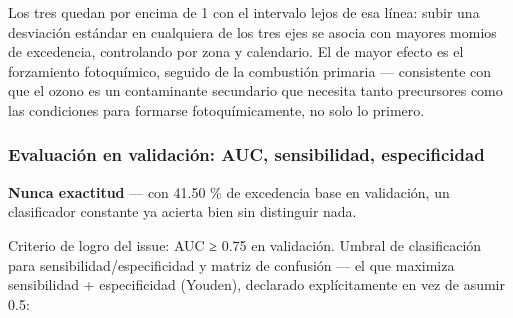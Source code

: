 \documentclass[
  spanish,
  letterpaper,
  DIV=11,
  numbers=noendperiod]{scrartcl}
\newenvironment{Shaded}{\begin{snugshade}}{\end{snugshade}}
\newcommand{\AttributeTok}[1]{\textcolor[rgb]{0.40,0.45,0.13}{#1}}
\newcommand{\CommentTok}[1]{\textcolor[rgb]{0.37,0.37,0.37}{#1}}
\newcommand{\ConstantTok}[1]{\textcolor[rgb]{0.56,0.35,0.01}{#1}}
\newcommand{\FunctionTok}[1]{\textcolor[rgb]{0.28,0.35,0.67}{#1}}
\newcommand{\NormalTok}[1]{\textcolor[rgb]{0.00,0.23,0.31}{#1}}
\newcommand{\OtherTok}[1]{\textcolor[rgb]{0.00,0.23,0.31}{#1}}
\newcommand{\SpecialCharTok}[1]{\textcolor[rgb]{0.37,0.37,0.37}{#1}}
\newcommand{\StringTok}[1]{\textcolor[rgb]{0.13,0.47,0.30}{#1}}
\begin{document}
Los tres quedan por encima de 1 con el intervalo lejos de esa línea:
subir una desviación estándar en cualquiera de los tres ejes se asocia
con mayores momios de excedencia, controlando por zona y calendario. El
de mayor efecto es el forzamiento fotoquímico, seguido de la combustión
primaria --- consistente con que el ozono es un contaminante secundario
que necesita tanto precursores como las condiciones para formarse
fotoquímicamente, no solo lo primero.

\subsubsection{Evaluación en validación: AUC, sensibilidad,
especificidad}\label{evaluaciuxf3n-en-validaciuxf3n-auc-sensibilidad-especificidad}

\textbf{Nunca exactitud} --- con 41.50 \% de excedencia base en
validación, un clasificador constante ya acierta bien sin distinguir
nada.

\begin{Shaded}
\end{Shaded}

Criterio de logro del issue: AUC ≥ 0.75 en validación. Umbral de
clasificación para sensibilidad/especificidad y matriz de confusión ---
el que maximiza sensibilidad + especificidad (Youden), declarado
explícitamente en vez de asumir 0.5:
\end{document}
